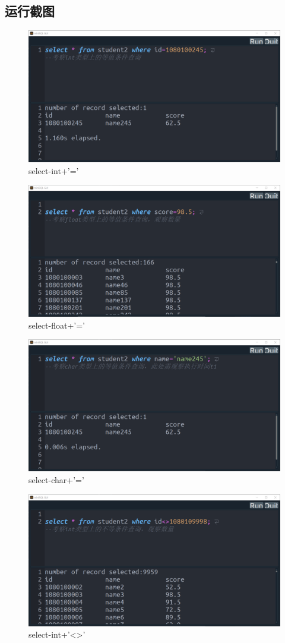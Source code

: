 \documentclass[UTF8]{ctexrep} %
\begin{document}
\subsection{运行截图}
\begin{figure}[H]
    \centering
    \includegraphics[width=0.8\linewidth]{figure/5.1.png}
    \caption{select-int+'='}
    \label{fig:runtime5.1}
\end{figure}
\begin{figure}[H]
    \centering
    \includegraphics[width=0.8\linewidth]{figure/5.2.png}
    \caption{select-float+'='}
    \label{fig:runtime5.2}
\end{figure}
\begin{figure}[H]
    \centering
    \includegraphics[width=0.8\linewidth]{figure/5.3.png}
    \caption{select-char+'='}
    \label{fig:runtime5.3}
\end{figure}
\begin{figure}[H]
    \centering
    \includegraphics[width=0.8\linewidth]{figure/5.4.png}
    \caption{select-int+'<>'}
    \label{fig:runtime5.4}
\end{figure}
\end{document}
